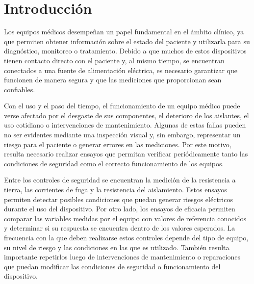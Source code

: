 \section{Introducción}


Los equipos médicos desempeñan un papel fundamental en el ámbito clínico, ya que permiten obtener información sobre
 el estado del paciente y utilizarla para su diagnóstico, monitoreo o tratamiento. Debido a que muchos de estos 
dispositivos tienen contacto directo con el paciente y, al mismo tiempo, se encuentran conectados a una fuente de
alimentación eléctrica, es necesario garantizar que funcionen de manera segura y que las mediciones que proporcionan
 sean confiables.

Con el uso y el paso del tiempo, el funcionamiento de un equipo médico puede verse afectado por el desgaste de sus 
componentes, el deterioro de los aislantes, el uso cotidiano o intervenciones de mantenimiento. Algunas de estas fallas
 pueden no ser evidentes mediante una inspección visual y, sin embargo, representar un riesgo para el paciente o generar 
errores en las mediciones. Por este motivo, resulta necesario realizar ensayos que permitan verificar periódicamente tanto
 las condiciones de seguridad como el correcto funcionamiento de los equipos.

Entre los controles de seguridad se encuentran la medición de la resistencia a tierra, las corrientes de fuga 
y la resistencia del aislamiento. Estos ensayos permiten detectar posibles condiciones que puedan generar riesgos
 eléctricos durante el uso del dispositivo. Por otro lado, los ensayos de eficacia permiten comparar las variables medidas
 por el equipo con valores de referencia conocidos y determinar si su respuesta se encuentra dentro de los valores esperados.
 La frecuencia con la que deben realizarse estos controles depende del tipo de equipo, su nivel de riesgo y las condiciones
 en las que es utilizado. También resulta importante repetirlos luego de intervenciones de mantenimiento o reparaciones
 que puedan modificar las condiciones de seguridad o funcionamiento del dispositivo.